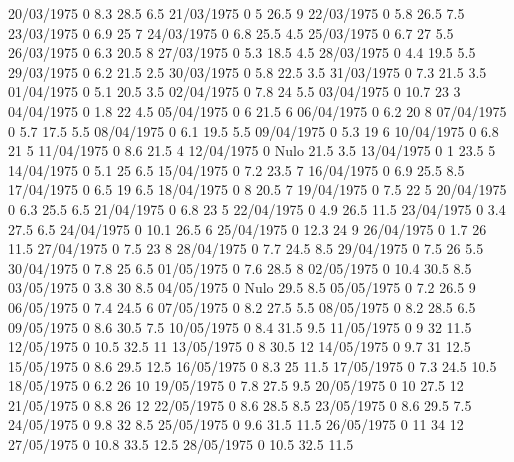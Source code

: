 20/03/1975  0      8.3    28.5   6.5 
21/03/1975  0      5      26.5   9 
22/03/1975  0      5.8    26.5   7.5 
23/03/1975  0      6.9    25     7 
24/03/1975  0      6.8    25.5   4.5 
25/03/1975  0      6.7    27     5.5 
26/03/1975  0      6.3    20.5   8 
27/03/1975  0      5.3    18.5   4.5 
28/03/1975  0      4.4    19.5   5.5 
29/03/1975  0      6.2    21.5   2.5 
30/03/1975  0      5.8    22.5   3.5 
31/03/1975  0      7.3    21.5   3.5 
01/04/1975  0      5.1    20.5   3.5 
02/04/1975  0      7.8    24     5.5 
03/04/1975  0      10.7   23     3 
04/04/1975  0      1.8    22     4.5 
05/04/1975  0      6      21.5   6 
06/04/1975  0      6.2    20     8 
07/04/1975  0      5.7    17.5   5.5 
08/04/1975  0      6.1    19.5   5.5 
09/04/1975  0      5.3    19     6 
10/04/1975  0      6.8    21     5 
11/04/1975  0      8.6    21.5   4 
12/04/1975  0     Nulo    21.5   3.5 
13/04/1975  0      1      23.5   5 
14/04/1975  0      5.1    25     6.5 
15/04/1975  0      7.2    23.5   7 
16/04/1975  0      6.9    25.5   8.5 
17/04/1975  0      6.5    19     6.5 
18/04/1975  0      8      20.5   7 
19/04/1975  0      7.5    22     5 
20/04/1975  0      6.3    25.5   6.5 
21/04/1975  0      6.8    23     5 
22/04/1975  0      4.9    26.5   11.5 
23/04/1975  0      3.4    27.5   6.5 
24/04/1975  0      10.1   26.5   6 
25/04/1975  0      12.3   24     9 
26/04/1975  0      1.7    26     11.5 
27/04/1975  0      7.5    23     8 
28/04/1975  0      7.7    24.5   8.5 
29/04/1975  0      7.5    26     5.5 
30/04/1975  0      7.8    25     6.5 
01/05/1975  0      7.6    28.5   8 
02/05/1975  0      10.4   30.5   8.5 
03/05/1975  0      3.8    30     8.5 
04/05/1975  0     Nulo    29.5   8.5 
05/05/1975  0      7.2    26.5   9 
06/05/1975  0      7.4    24.5   6 
07/05/1975  0      8.2    27.5   5.5 
08/05/1975  0      8.2    28.5   6.5 
09/05/1975  0      8.6    30.5   7.5 
10/05/1975  0      8.4    31.5   9.5 
11/05/1975  0      9      32     11.5 
12/05/1975  0      10.5   32.5   11 
13/05/1975  0      8      30.5   12 
14/05/1975  0      9.7    31     12.5 
15/05/1975  0      8.6    29.5   12.5 
16/05/1975  0      8.3    25     11.5 
17/05/1975  0      7.3    24.5   10.5 
18/05/1975  0      6.2    26     10 
19/05/1975  0      7.8    27.5   9.5 
20/05/1975  0      10     27.5   12 
21/05/1975  0      8.8    26     12 
22/05/1975  0      8.6    28.5   8.5 
23/05/1975  0      8.6    29.5   7.5 
24/05/1975  0      9.8    32     8.5 
25/05/1975  0      9.6    31.5   11.5 
26/05/1975  0      11     34     12 
27/05/1975  0      10.8   33.5   12.5 
28/05/1975  0      10.5   32.5   11.5 

